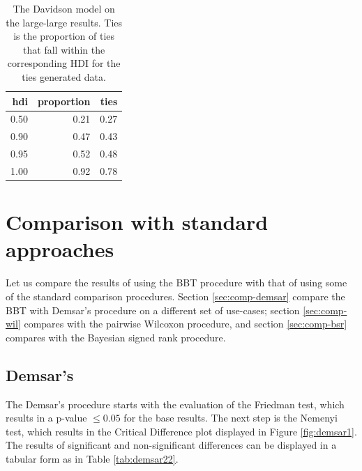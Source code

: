 \documentclass[twoside,11pt,preprint]{article}
\begin{document}
\begin{table}

\caption{\label{tab:ties2}\label{tab:tiesppc2} The Davidson model on the large-large results. Ties is the proportion of ties that fall within the corresponding HDI for the ties generated data.}
\centering
\begin{tabular}[t]{rrr}
\toprule
\textbf{hdi} & \textbf{proportion} & \textbf{ties}\\
\midrule
0.50 & 0.21 & 0.27\\
0.90 & 0.47 & 0.43\\
0.95 & 0.52 & 0.48\\
1.00 & 0.92 & 0.78\\
\bottomrule
\end{tabular}
\end{table}

\hypertarget{comparison-with-standard-approaches}{%
\section{\texorpdfstring{Comparison with standard approaches \label{compare-tests}}{Comparison with standard approaches }}\label{comparison-with-standard-approaches}}

Let us compare the results of using the BBT procedure with that of using some of the standard comparison procedures. Section \ref{sec:comp-demsar} compare the BBT with Demsar's procedure on a different set of use-cases; section \ref{sec:comp-wil} compares with the pairwise Wilcoxon procedure, and section \ref{sec:comp-bsr} compares with the Bayesian signed rank procedure.

\hypertarget{demsars}{%
\subsection{\texorpdfstring{Demsar's \label{sec:comp-demsar}}{Demsar's }}\label{demsars}}

The Demsar's procedure starts with the evaluation of the Friedman test, which results in a p-value \(\le 0.05\) for the base results.
The next step is the Nemenyi test, which results in the Critical Difference plot displayed in Figure \ref{fig:demsar1}.
The results of significant and non-significant differences can be displayed in a tabular form as in
Table \ref{tab:demsar22}.
\end{document}
